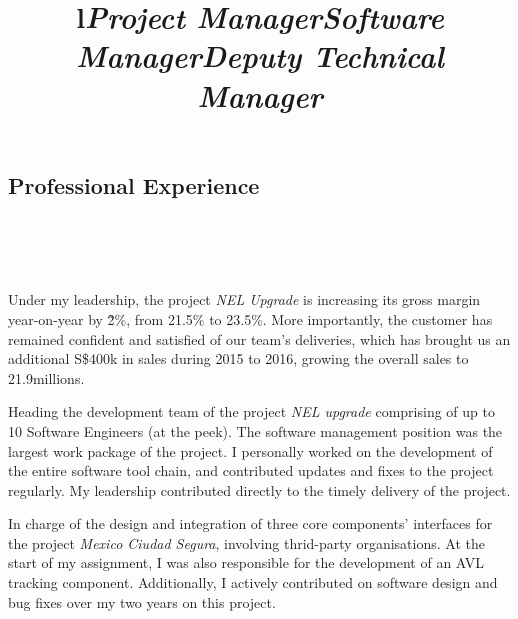 \documentclass[overlapped,line,letterpaper]{res}
\begin{document}
\begin{resume}

  \section{\bf Professional Experience}


  \begin{format}
    \title{l}\\
    \\
    \body\\
  \end{format}

  \title{\em Project Manager}
  \begin{position}
    Under my leadership, the project {\em NEL Upgrade} is increasing its gross margin year-on-year
    by \~2\%, from 21.5\% to 23.5\%. More importantly, the customer has remained
    confident and satisfied of our team's deliveries, which has brought us an
    additional S\$400k in sales during 2015 to 2016, growing the overall sales
    to 21.9millions.
  \end{position}

  \title{\em Software Manager}
  \begin{position}
    Heading the development team of the project {\em NEL upgrade} comprising of
    up to 10 Software Engineers (at the peek). The software management position
    was the largest work package of the project.  I personally worked on the
    development of the entire software tool chain, and contributed updates and
    fixes to the project regularly. My leadership contributed directly to the
    timely delivery of the project.
  \end{position}

  \title{\em Deputy Technical Manager}
  \begin{position}
    In charge of the design and integration of three core components' interfaces
    for the project {\em Mexico Ciudad Segura}, involving thrid-party
    organisations. At the start of my assignment, I was also responsible for the
    development of an AVL tracking component. Additionally, I actively
    contributed on software design and bug fixes over my two years on this
    project.
  \end{position}


\end{resume}
\end{document}
